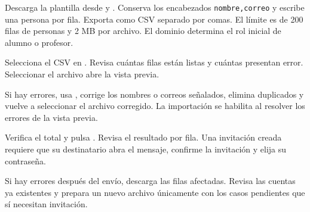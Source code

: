 Descarga la plantilla desde  y . Conserva los encabezados \texttt{nombre,correo} y escribe una persona por fila. Exporta como CSV separado por comas. El límite es de 200 filas de personas y 2 MB por archivo. El dominio determina el rol inicial de alumno o profesor.
\begin{pasos}
\item Selecciona el CSV en . Revisa cuántas filas están listas y cuántas presentan error. Seleccionar el archivo abre la vista previa.
\item Si hay errores, usa , corrige los nombres o correos señalados, elimina duplicados y vuelve a seleccionar el archivo corregido. La importación se habilita al resolver los errores de la vista previa.
\item Verifica el total y pulsa . Revisa el resultado por fila. Una invitación creada requiere que su destinatario abra el mensaje, confirme la invitación y elija su contraseña.
\item Si hay errores después del envío, descarga las filas afectadas. Revisa las cuentas ya existentes y prepara un nuevo archivo únicamente con los casos pendientes que sí necesitan invitación.
\end{pasos}

